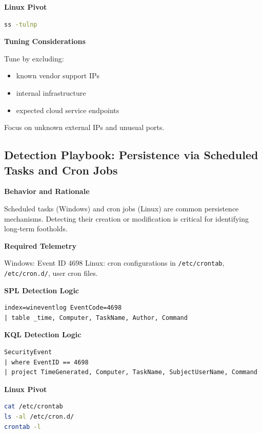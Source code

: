 \textbf{Linux Pivot}

\begin{lstlisting}[language=bash]
ss -tulnp
\end{lstlisting}

\textbf{Tuning Considerations}

Tune by excluding:

\begin{itemize}
    \item known vendor support IPs
    \item internal infrastructure
    \item expected cloud service endpoints
\end{itemize}

Focus on unknown external IPs and unusual ports.


\subsection*{Detection Playbook: Persistence via Scheduled Tasks and Cron Jobs}

\textbf{Behavior and Rationale}

Scheduled tasks (Windows) and cron jobs (Linux) are common persistence mechanisms. Detecting their creation or modification 
is critical for identifying long-term footholds.

\textbf{Required Telemetry}

Windows: Event ID 4698  
Linux: cron configurations in \texttt{/etc/crontab}, \texttt{/etc/cron.d/}, user cron files.

\textbf{SPL Detection Logic}

\begin{lstlisting}
index=wineventlog EventCode=4698
| table _time, Computer, TaskName, Author, Command
\end{lstlisting}

\textbf{KQL Detection Logic}

\begin{lstlisting}
SecurityEvent
| where EventID == 4698
| project TimeGenerated, Computer, TaskName, SubjectUserName, Command
\end{lstlisting}

\textbf{Linux Pivot}

\begin{lstlisting}[language=bash]
cat /etc/crontab
ls -al /etc/cron.d/
crontab -l
\end{lstlisting}

